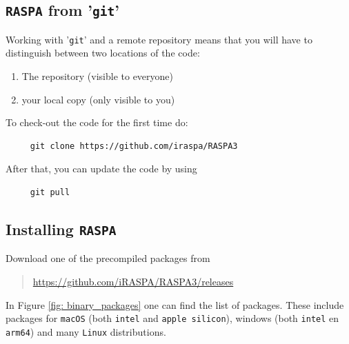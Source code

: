 \subsection{\texttt{RASPA} from '\texttt{git}'}

Working with '\texttt{git}' and a remote repository  means that you will have to distinguish between two locations of the code:
\begin{enumerate}
 \item{The repository (visible to everyone)}
 \item{your local copy (only visible to you)}
\end{enumerate}

To check-out the code for the first time do:
\begin{verbatim}
     git clone https://github.com/iraspa/RASPA3
\end{verbatim}
After that, you can update the code by using
\begin{verbatim}
     git pull
\end{verbatim}

\subsection{Installing \texttt{RASPA}}

Download one of the precompiled packages from
\begin{framed}
  \begin{quote}
    \url{https://github.com/iRASPA/RASPA3/releases}
  \end{quote}
\end{framed}
In Figure \ref{fig: binary_packages} one can find the list of packages. 
These include packages for \texttt{macOS} (both \texttt{intel} and \texttt{apple silicon}),
windows (both \texttt{intel} en \texttt{arm64}) and many \texttt{Linux} distributions.


